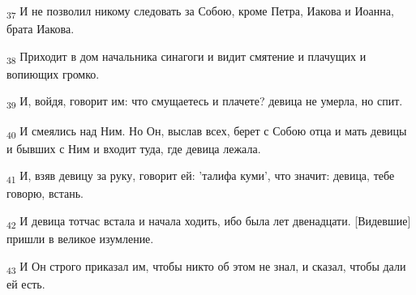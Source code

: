 \begin{tcolorbox}
\textsubscript{37} И не позволил никому следовать за Собою, кроме Петра, Иакова и Иоанна, брата Иакова.
\end{tcolorbox}
\begin{tcolorbox}
\textsubscript{38} Приходит в дом начальника синагоги и видит смятение и плачущих и вопиющих громко.
\end{tcolorbox}
\begin{tcolorbox}
\textsubscript{39} И, войдя, говорит им: что смущаетесь и плачете? девица не умерла, но спит.
\end{tcolorbox}
\begin{tcolorbox}
\textsubscript{40} И смеялись над Ним. Но Он, выслав всех, берет с Собою отца и мать девицы и бывших с Ним и входит туда, где девица лежала.
\end{tcolorbox}
\begin{tcolorbox}
\textsubscript{41} И, взяв девицу за руку, говорит ей: 'талифа куми', что значит: девица, тебе говорю, встань.
\end{tcolorbox}
\begin{tcolorbox}
\textsubscript{42} И девица тотчас встала и начала ходить, ибо была лет двенадцати. [Видевшие] пришли в великое изумление.
\end{tcolorbox}
\begin{tcolorbox}
\textsubscript{43} И Он строго приказал им, чтобы никто об этом не знал, и сказал, чтобы дали ей есть.
\end{tcolorbox}
